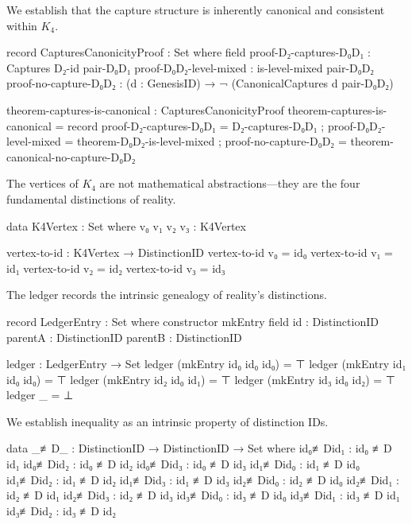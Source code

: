 \documentclass[11pt,a4paper]{book}
\begin{document}
We establish that the capture structure is inherently canonical and consistent within $K_4$.

\begin{code}
record CapturesCanonicityProof : Set where
  field
    proof-D₂-captures-D₀D₁ : Captures D₂-id pair-D₀D₁
    proof-D₀D₂-level-mixed : is-level-mixed pair-D₀D₂
    proof-no-capture-D₀D₂  : (d : GenesisID) → ¬ (CanonicalCaptures d pair-D₀D₂)

theorem-captures-is-canonical : CapturesCanonicityProof
theorem-captures-is-canonical = record
  { proof-D₂-captures-D₀D₁ = D₂-captures-D₀D₁
  ; proof-D₀D₂-level-mixed = theorem-D₀D₂-is-level-mixed
  ; proof-no-capture-D₀D₂ = theorem-canonical-no-capture-D₀D₂
  }
\end{code}

The vertices of $K_4$ are not mathematical abstractions—they are the four fundamental distinctions of reality.

\begin{code}
data K4Vertex : Set where
  v₀ v₁ v₂ v₃ : K4Vertex

vertex-to-id : K4Vertex → DistinctionID
vertex-to-id v₀ = id₀
vertex-to-id v₁ = id₁
vertex-to-id v₂ = id₂
vertex-to-id v₃ = id₃
\end{code}

The ledger records the intrinsic genealogy of reality's distinctions.

\begin{code}
record LedgerEntry : Set where
  constructor mkEntry
  field
    id      : DistinctionID
    parentA : DistinctionID
    parentB : DistinctionID

ledger : LedgerEntry → Set
ledger (mkEntry id₀ id₀ id₀) = ⊤
ledger (mkEntry id₁ id₀ id₀) = ⊤
ledger (mkEntry id₂ id₀ id₁) = ⊤
ledger (mkEntry id₃ id₀ id₂) = ⊤
ledger _                     = ⊥
\end{code}

We establish inequality as an intrinsic property of distinction IDs.

\begin{code}
data _≢D_ : DistinctionID → DistinctionID → Set where
  id₀≢Did₁ : id₀ ≢D id₁
  id₀≢Did₂ : id₀ ≢D id₂
  id₀≢Did₃ : id₀ ≢D id₃
  id₁≢Did₀ : id₁ ≢D id₀
  id₁≢Did₂ : id₁ ≢D id₂
  id₁≢Did₃ : id₁ ≢D id₃
  id₂≢Did₀ : id₂ ≢D id₀
  id₂≢Did₁ : id₂ ≢D id₁
  id₂≢Did₃ : id₂ ≢D id₃
  id₃≢Did₀ : id₃ ≢D id₀
  id₃≢Did₁ : id₃ ≢D id₁
  id₃≢Did₂ : id₃ ≢D id₂
\end{code}
\end{document}
